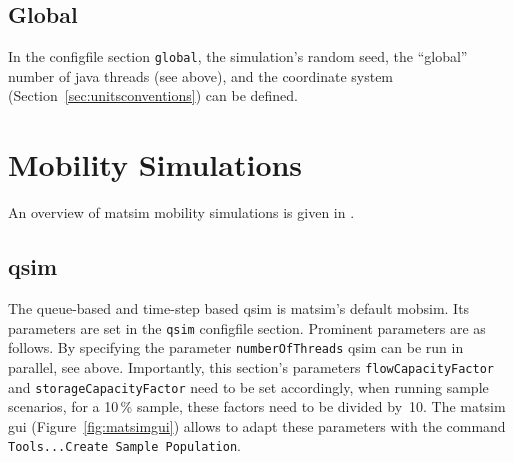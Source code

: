 

\subsection{Global}
\label{sec:using-global}
In the \gls{configfile} section \lstinline|global|, the simulation's random seed, the ``global'' number of \gls{java} threads (see above), and the coordinate system (\cf Section~\ref{sec:unitsconventions}) can be defined. 

\section{Mobility Simulations}
\label{sec:using-mobsims}
An overview of \gls{matsim} mobility simulations is given in \citet[][]{Dobler_TechRep_IVT_2011}. %

\subsection{\protect\gls{qsim}}
\label{sec:using-qsim}
The queue-based and time-step based \gls{qsim} \citep[][]{Dobler_TechRep_IVT_2011, Dobler_STRC_2010} is \gls{matsim}'s default \gls{mobsim}. 
Its parameters are set in the \lstinline|qsim| \gls{configfile} section. Prominent parameters are as follows. By specifying the parameter \lstinline|numberOfThreads| \gls{qsim} can be run in parallel, see above. 
Importantly, this section's parameters \lstinline|flowCapacityFactor| and \lstinline|storageCapacityFactor| need to be set accordingly, when running sample scenarios, \eg for a 10\,\% sample, these factors need to be divided by~10. The \gls{matsim} \gls{gui} (Figure~\ref{fig:matsimgui}) allows to adapt these parameters with the command \lstinline|Tools...Create Sample Population|.

